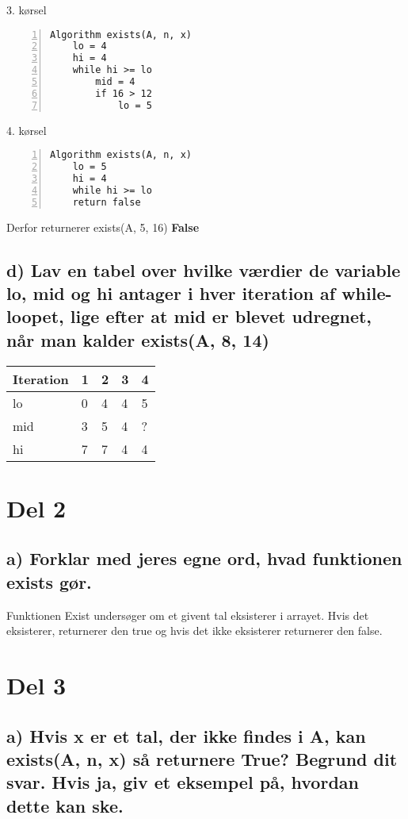 \documentclass{article}
\begin{document}
3. kørsel
\begin{Verbatim}[frame=lines,label=Algorithm exists,labelposition=topline, numbers=left]
Algorithm exists(A, n, x)
    lo = 4
    hi = 4
    while hi >= lo
        mid = 4
        if 16 > 12 
            lo = 5
\end{Verbatim}

4. kørsel
\begin{Verbatim}[frame=lines,label=Algorithm exists,labelposition=topline, numbers=left]
Algorithm exists(A, n, x)
    lo = 5
    hi = 4
    while hi >= lo
    return false
\end{Verbatim}

Derfor returnerer exists(A, 5, 16) \textbf{False} \newpage


\subsection*{d) Lav en tabel over hvilke værdier de variable lo, mid og hi antager i hver iteration af while-loopet, lige efter at mid er blevet udregnet, når man kalder exists(A, 8, 14)} 

\begin{center}
\begin{tabular}{ | m{5em} | m{1cm}| m{1cm}| m{1cm}|m{1cm}| } 
  \hline
  Iteration & 1 & 2 & 3 & 4 \\ 
  \hline
  lo & 0 & 4 & 4 & 5 \\ 
  \hline
  mid & 3 & 5 & 4 & ? \\ 
  \hline
  hi & 7 & 7 & 4 & 4 \\ 
  \hline
\end{tabular}
\end{center}


\section*{Del 2} \subsection*{a) Forklar med jeres egne ord, hvad funktionen exists gør.} 

Funktionen Exist undersøger om et givent tal eksisterer i arrayet. Hvis det eksisterer, returnerer den true og hvis det ikke eksisterer returnerer den false. 

\section*{Del 3} \subsection*{a) Hvis x er et tal, der ikke findes i A, kan exists(A, n, x) så returnere True? Begrund dit svar. Hvis ja, giv et eksempel på, hvordan dette kan ske.} 
\end{document}
